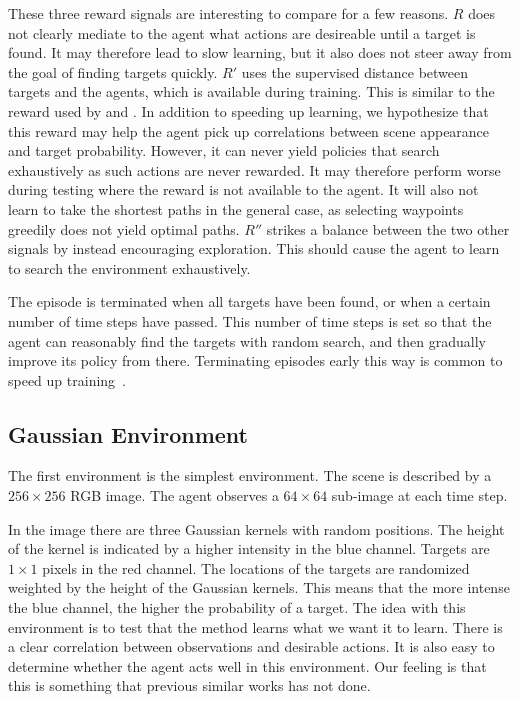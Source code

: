 These three reward signals are interesting to compare for a few reasons.
\(R\) does not clearly mediate to the agent what actions are desireable until a target is found.
It may therefore lead to slow learning, but it also does not steer away from the goal of finding targets quickly.
\(R'\) uses the supervised distance between targets and the agents, which is available during training.
This is similar to the reward used by \cite{caicedo_active_2015} and \cite{ghesu_artificial_2016}.
In addition to speeding up learning, we hypothesize that this reward may help the agent pick up correlations between scene appearance and target probability.
However, it can never yield policies that search exhaustively as such actions are never rewarded.
It may therefore perform worse during testing where the reward is not available to the agent.
It will also not learn to take the shortest paths in the general case, as selecting waypoints greedily does not yield optimal paths.
\(R''\) strikes a balance between the two other signals by instead encouraging exploration.
This should cause the agent to learn to search the environment exhaustively.

The episode is terminated when all targets have been found, or when a certain number of time steps have passed.
This number of time steps is set so that the agent can reasonably find the targets with random search, and then gradually improve its policy from there.
Terminating episodes early this way is common to speed up training~\cite{pardo_timelimits_2022}.


\subsection{Gaussian Environment}

The first environment is the simplest environment. 
The scene is described by a \(256 \times 256\) RGB image.
The agent observes a \(64 \times 64\) sub-image at each time step.

In the image there are three Gaussian kernels with random positions.
The height of the kernel is indicated by a higher intensity in the blue channel.
Targets are \(1 \times 1\) pixels in the red channel.
The locations of the targets are randomized weighted by the height of the Gaussian kernels.
This means that the more intense the blue channel, the higher the probability of a target.
The idea with this environment is to test that the method learns what we want it to learn.
There is a clear correlation between observations and desirable actions.
It is also easy to determine whether the agent acts well in this environment.
Our feeling is that this is something that previous similar works has not done. %

